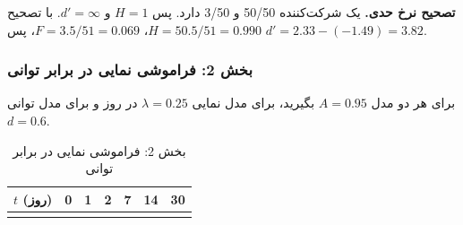 \textbf{تصحیح نرخ حدی.} یک شرکت‌کننده 50/50  و 3/50  دارد. پس \(H = 1\) و \(d' = \infty\). با تصحیح 
\(H = 50.5/51 = 0.990\)، \(F = 3.5/51 = 0.069\)، پس
\(d' = 2.33 - (-1.49) = 3.82\).

\subsubsection{بخش 2: فراموشی نمایی در برابر توانی}

برای هر دو مدل \(A = 0.95\) بگیرید، برای مدل نمایی \(\lambda = 0.25\) در
روز و برای مدل توانی \(d = 0.6\).

\begin{landscape}\small
\begin{longtable}[]{@{}
  >{\raggedright\arraybackslash}p{}
  >{\raggedright\arraybackslash}p{}
  >{\raggedright\arraybackslash}p{}
  >{\raggedright\arraybackslash}p{}
  >{\raggedright\arraybackslash}p{}
  >{\raggedright\arraybackslash}p{}
  >{\raggedright\arraybackslash}p{}@{}}
\caption{\centering بخش 2: فراموشی نمایی در برابر توانی}\tabularnewline
\toprule\noalign{}
\begin{minipage}[b]{\linewidth}\raggedright
\(t\) (روز)
\end{minipage} & \begin{minipage}[b]{\linewidth}\raggedright
0
\end{minipage} & \begin{minipage}[b]{\linewidth}\raggedright
1
\end{minipage} & \begin{minipage}[b]{\linewidth}\raggedright
2
\end{minipage} & \begin{minipage}[b]{\linewidth}\raggedright
7
\end{minipage} & \begin{minipage}[b]{\linewidth}\raggedright
14
\end{minipage} & \begin{minipage}[b]{\linewidth}\raggedright
30
\end{minipage} \\
\midrule\noalign{}
\endfirsthead
\toprule\noalign{}
\begin{minipage}[b]{\linewidth}\raggedright

\end{minipage}
\end{longtable}
\end{landscape}
